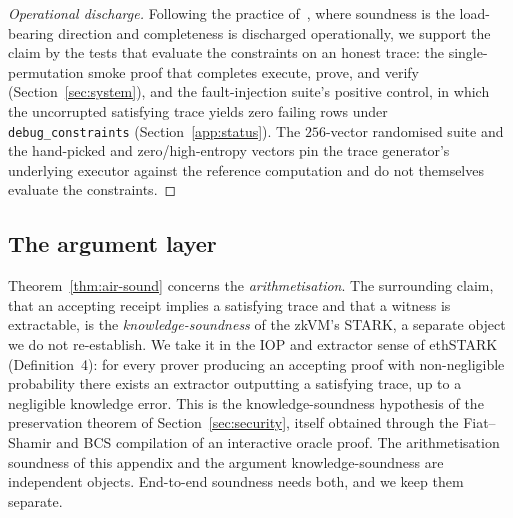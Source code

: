 \begin{proof}[Operational discharge]
Following the practice of~\cite{cairoverify}, where soundness is the load-bearing direction and completeness is discharged operationally, we support the claim by the tests that evaluate the constraints on an honest trace: the single-permutation smoke proof that completes execute, prove, and verify (Section~\ref{sec:system}), and the fault-injection suite's positive control, in which the uncorrupted satisfying trace yields zero failing rows under \texttt{debug\_constraints} (Section~\ref{app:status}). The $256$-vector randomised suite and the hand-picked and zero/high-entropy vectors pin the trace generator's underlying executor against the reference computation and do not themselves evaluate the constraints.
\end{proof}

\subsection{The argument layer}\label{app:argument}
Theorem~\ref{thm:air-sound} concerns the \emph{arithmetisation}. The surrounding claim, that an accepting receipt implies a satisfying trace and that a witness is extractable, is the \emph{knowledge-soundness} of the zkVM's STARK, a separate object we do not re-establish. We take it in the IOP and extractor sense of ethSTARK~\cite{ethstark} (Definition~4): for every prover producing an accepting proof with non-negligible probability there exists an extractor outputting a satisfying trace, up to a negligible knowledge error. This is the knowledge-soundness hypothesis of the preservation theorem of Section~\ref{sec:security}, itself obtained through the Fiat--Shamir and BCS compilation of an interactive oracle proof. The arithmetisation soundness of this appendix and the argument knowledge-soundness are independent objects. End-to-end soundness needs both, and we keep them separate.

